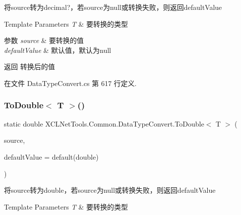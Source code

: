 将source转为decimal?，若source为null或转换失败，则返回default\+Value 


\begin{DoxyTemplParams}{Template Parameters}
{\em T} & 要转换的类型\\
\hline
\end{DoxyTemplParams}

\begin{DoxyParams}{参数}
{\em source} & 要转换的值\\
\hline
{\em default\+Value} & 默认值，默认为null\\
\hline
\end{DoxyParams}
\begin{DoxyReturn}{返回}
转换后的值
\end{DoxyReturn}


在文件 Data\+Type\+Convert.\+cs 第 617 行定义.

\mbox{\label{class_x_c_l_net_tools_1_1_common_1_1_data_type_convert_a331227ffa8db1d71402b3154da934f9c}} 
\subsubsection{\texorpdfstring{To\+Double$<$ T $>$()}{ToDouble< T >()}}
{\footnotesize\ttfamily static double X\+C\+L\+Net\+Tools.\+Common.\+Data\+Type\+Convert.\+To\+Double$<$ T $>$ (\begin{DoxyParamCaption}\item[{T}]{source,  }\item[{double}]{default\+Value = {\ttfamily default(double)} }\end{DoxyParamCaption})\hspace{0.3cm}{\ttfamily [static]}}



将source转为double，若source为null或转换失败，则返回default\+Value 


\begin{DoxyTemplParams}{Template Parameters}
{\em T} & 要转换的类型\\
\hline
\end{DoxyTemplParams}

